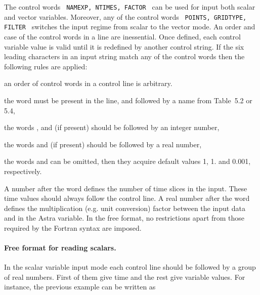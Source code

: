 The control words {\tt~NAMEXP, NTIMES, FACTOR~} can be used for
input both scalar and vector variables.
Moreover, any of the control words {\tt~POINTS, GRIDTYPE, FILTER~} 
switches the input regime from scalar to the vector mode.
An order and case of the control words in a line are inessential.
Once defined, each control variable value is valid until it is redefined
by another control string.
If the six leading characters in an input string match any of the
control words then the following rules are applied: 
\begin{description}
\vspace*{-1ex}
\item[--] an order of control words in a control line is arbitrary.
\vspace*{-1ex}
\item[--] the word  must be present in the line, 
	and followed by a name from Table~5.2 or 5.4,
\vspace*{-1ex}
\item[--] the words ,  and 
    (if present) should be followed by an integer number,
\vspace*{-1ex}
\item[--] the words  and  
   (if present) should be followed by a real number,
\vspace*{-1ex}
\item[--] the words  and  can be
omitted, then they acquire default values 1, 1. and 0.001, respectively.
\end{description}
\vspace*{-1ex}\noindent
A number after the word  defines the number of time slices
in the input.  
These time values should always follow the control line.
A real number after the word  defines the multiplication
(e.g. unit conversion) factor between the input data and in the Astra
variable.  
In the free format, no restrictions apart from those required by the
Fortran syntax are imposed. 

\paragraph{Free format for reading scalars.}
In the scalar variable input mode each control line should be followed
by a group of  real numbers.
First  of them give time and the rest give variable values.
For instance, the previous example  can be written as
\smallskip\\
\vskip 10pt


